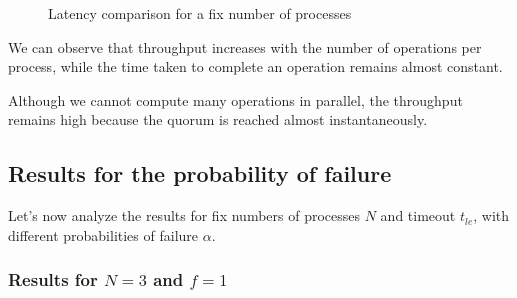 \documentclass{article}
\begin{document}
\begin{figure}[ht!]
    \centering
    \caption{Latency comparison for a fix number of processes}
\end{figure}

We can observe that throughput increases with the number of operations
per process, while the time taken to complete an operation remains almost constant.

Although we cannot compute many operations in parallel, the throughput
remains high because the quorum is reached almost instantaneously.

\newpage

\subsection{Results for the probability of failure}
Let's now analyze the results for fix numbers of processes $N$ and timeout $t_{le}$, with different probabilities of failure $\alpha$.

\subsubsection{Results for \(N = 3\) and \(f = 1\)}
\end{document}
